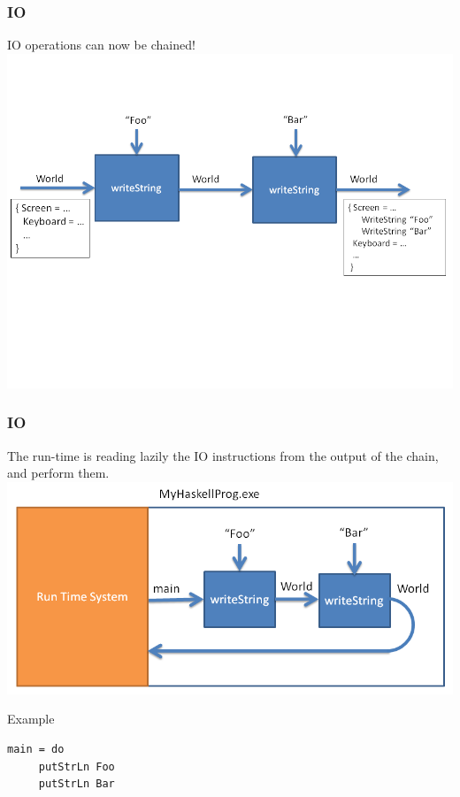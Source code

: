 \documentclass{beamer}
\begin{document}
\begin{frame}
\frametitle{IO}
 IO operations can now be chained!
 \includegraphics[width=1\linewidth]{figs/worldChain}

\end{frame}

\begin{frame}[fragile]
\frametitle{IO}
 The run-time is reading lazily the IO instructions from the output of the chain, and perform them.
 \includegraphics[width=0.8\linewidth]{figs/runTime}
 \begin{block}{Example}
  \begin{lstlisting}[basicstyle=\small]
   main = do
     putStrLn Foo
     putStrLn Bar
  \end{lstlisting}
 \end{block}

\end{frame}
\end{document}
